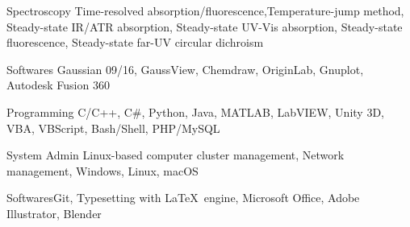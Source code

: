 

\begin{cvskills}


\cvskill
{Spectroscopy} %
{Time-resolved absorption/fluorescence,Temperature-jump method, Steady-state IR/ATR absorption, Steady-state UV-Vis absorption, Steady-state fluorescence, Steady-state far-UV circular dichroism} %


\cvskill
{Softwares}
{Gaussian 09/16, GaussView, Chemdraw, OriginLab, Gnuplot, Autodesk Fusion 360}


\end{cvskills}


\begin{cvskills}


\cvskill
{Programming}
{C/C++, C\#, Python, Java, MATLAB, LabVIEW, Unity 3D, VBA, VBScript, Bash/Shell, PHP/MySQL}




\cvskill
{System Admin}
{Linux-based computer cluster management, Network management, Windows, Linux, macOS}


\cvskill
{Softwares}{Git, Typesetting with \LaTeX\ engine, Microsoft Office, Adobe Illustrator, Blender}


\end{cvskills}